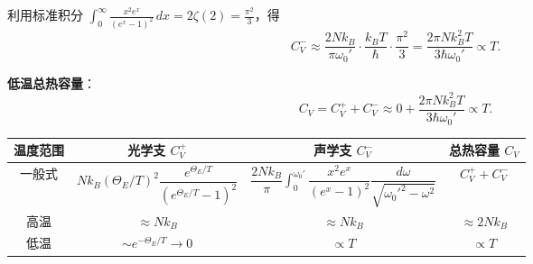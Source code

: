 \begin{derivationbox}[标准解题过程]
利用标准积分 $\displaystyle\int_0^{\infty}\frac{x^2e^x}{(e^x-1)^2}\,dx=2\zeta(2)=\frac{\pi^2}{3}$，得
\begin{equation}
C_V^-\approx\frac{2Nk_B}{\pi\omega_0'}\cdot\frac{k_BT}{\hbar}\cdot\frac{\pi^2}{3}
=\frac{2\pi Nk_B^2T}{3\hbar\omega_0'}\propto T.
\end{equation}

\textbf{低温总热容量}：
\begin{equation}
C_V=C_V^++C_V^-\approx0+\frac{2\pi Nk_B^2T}{3\hbar\omega_0'}\propto T.
\end{equation}
\end{derivationbox}

\begin{formulabox}[答案汇总]
\begin{center}
\begin{tabular}{cccc}
\toprule
温度范围 & 光学支 $C_V^+$ & 声学支 $C_V^-$ & 总热容量 $C_V$ \\
\midrule
一般式 & $Nk_B(\Theta_E/T)^2\dfrac{e^{\Theta_E/T}}{(e^{\Theta_E/T}-1)^2}$ & $\dfrac{2Nk_B}{\pi}\displaystyle\int_0^{\omega_0'}\dfrac{x^2e^x}{(e^x-1)^2}\dfrac{d\omega}{\sqrt{\omega_0'^2-\omega^2}}$ & $C_V^++C_V^-$ \\[12pt]
高温 & $\approx Nk_B$ & $\approx Nk_B$ & $\approx2Nk_B$ \\[8pt]
低温 & $\sim e^{-\Theta_E/T}\to0$ & $\propto T$ & $\propto T$ \\
\bottomrule
\end{tabular}
\end{center}
\end{formulabox}


